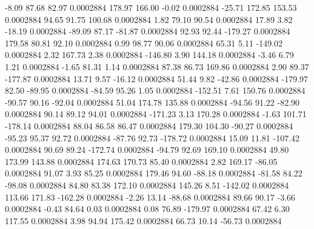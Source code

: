        -8.09       87.68       82.97     0.0002884
      178.97      166.00       -0.02     0.0002884
      -25.71      172.85      153.53     0.0002884
       94.65       91.75      100.68     0.0002884
        1.82       79.10       90.54     0.0002884
       17.89        3.82      -18.19     0.0002884
      -89.09       87.17      -81.87     0.0002884
       92.93       92.44     -179.27     0.0002884
      179.58       80.81       92.10     0.0002884
        0.99       98.77       90.06     0.0002884
       65.31        5.11     -149.02     0.0002884
        2.32      167.73        2.38     0.0002884
     -146.80        3.90      144.18     0.0002884
       -3.46        6.79        1.21     0.0002884
       -1.65       81.31        1.14     0.0002884
       87.38       86.73      169.86     0.0002884
        2.90       89.37     -177.87     0.0002884
       13.71        9.57      -16.12     0.0002884
       51.44        9.82      -42.86     0.0002884
     -179.97       82.50      -89.95     0.0002884
      -84.59       95.26        1.05     0.0002884
     -152.51        7.61      150.76     0.0002884
      -90.57       90.16      -92.04     0.0002884
       51.04      174.78      135.88     0.0002884
      -94.56       91.22      -82.90     0.0002884
       90.14       89.12       94.01     0.0002884
     -171.23        3.13      170.28     0.0002884
       -1.63      101.71     -178.14     0.0002884
       88.04       86.58       86.47     0.0002884
      179.30      104.30      -90.27     0.0002884
      -95.23       95.37       92.72     0.0002884
      -87.76       92.73     -178.72     0.0002884
       15.09       11.81     -107.42     0.0002884
       90.69       89.24     -172.74     0.0002884
      -94.79       92.69      169.10     0.0002884
       49.80      173.99      143.88     0.0002884
      174.63      170.73       85.40     0.0002884
        2.82      169.17      -86.05     0.0002884
       91.07        3.93       85.25     0.0002884
      179.46       94.60      -88.18     0.0002884
      -81.58       84.22      -98.08     0.0002884
       84.80       83.38      172.10     0.0002884
      145.26        8.51     -142.02     0.0002884
      113.66      171.83     -162.28     0.0002884
       -2.26       13.14      -88.68     0.0002884
       89.66       90.17       -3.66     0.0002884
       -0.43       84.64        0.03     0.0002884
        0.08       76.89     -179.97     0.0002884
       67.42        6.30      117.55     0.0002884
        3.98       94.94      175.42     0.0002884
       66.73       10.14      -56.73     0.0002884
